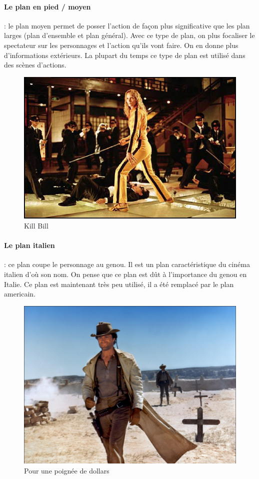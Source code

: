 \documentclass{article}
\begin{document}
	\paragraph{Le plan en pied / moyen}: le plan moyen permet de posser l'action de façon plus significative que les plan larges (plan d'ensemble et plan général). Avec ce type de plan, on plus focaliser le spectateur sur les personnages et l'action qu'ils vont faire. On en donne plus d'informations extérieurs. La plupart du temps ce type de plan est utilisé dans des scènes d'actions.  
	
\begin{figure}[h]
\centering
\includegraphics[scale=0.3]{img/plan3.png}
\caption{Kill Bill}
\label{fig:regle_tiers}
\end{figure}

\clearpage

	\paragraph{Le plan italien}: ce plan coupe le personnage au genou. Il est un plan caractéristique du cinéma italien d'où son nom. On pense que ce plan est dût à l'importance du genou en Italie. Ce plan est maintenant très peu utilisé, il a été remplacé par le plan americain.

\begin{figure}[h]
\centering
\includegraphics[scale=0.13]{img/plan4.jpg}
\caption{Pour une poignée de dollars}
\label{fig:regle_tiers}
\end{figure}
\end{document}
